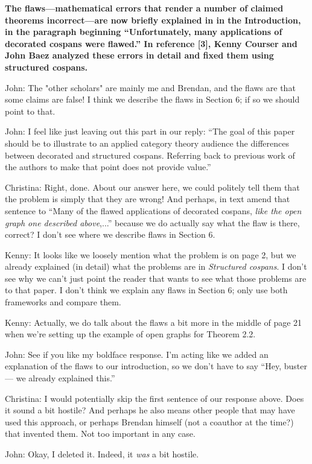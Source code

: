\documentclass[reqno]{amsart}
\def\chris{\color{purple} Christina: }
\def\john{\color{red} John: }
\def\kenny{\color{blue} Kenny: }
\begin{document}
\begin{enumerate}
{\bf  The flaws---mathematical errors that render a number of claimed theorems incorrect---are now briefly explained in  in the Introduction, in the 
paragraph beginning ``Unfortunately, many applications of decorated cospans were flawed.''  In reference [3], Kenny Courser and John Baez analyzed 
these errors in detail and fixed them using structured cospans.  }
  

\iffalse
{\john The "other scholars" are mainly me and Brendan, and the flaws are that some claims are false! I think we describe the flaws in Section 6; if so 
we should point to that.}   

{\john I feel like just leaving out this part in our reply: ``The goal of this paper should be to illustrate to an applied category theory audience the differences between 
decorated and structured cospans. Referring back to previous work of the authors to make that point does not provide value.''}

{\chris Right, done. About our answer here, we could politely tell them that the problem is simply that they are wrong! And perhaps, in 
text amend that sentence to ``Many of the flawed applications of decorated cospans, \emph{like the open graph one described above},...'' because we 
do actually say what the flaw is there, correct? I don't see where we describe flaws in Section 6.}

{\kenny It looks like we loosely mention what the problem is on page 2, but we already explained (in detail) what the problems are in \emph{Structured cospans}. I don't see why we can't just point the reader that wants to see what those problems are to that paper. I don't think we explain any flaws in Section 6; only use both frameworks and compare them.}

{\kenny Actually, we do talk about the flaws a bit more in the middle of page 21 when we're setting up the example of open graphs for Theorem 2.2.}

{\john See if you like my boldface response.  I'm acting like we added an explanation of the flaws to our introduction, so we don't have to say ``Hey, 
buster --- we already explained this.''}

{\chris I would potentially skip the first sentence of our response above. Does it sound a bit hostile? And perhaps he also means other people that 
may have used this approach, or perhaps Brendan himself (not a coauthor at the time?) that invented them. Not too important in any case.}

{\john Okay, I deleted it.  Indeed, it \emph{was} a bit hostile.}


\end{enumerate}
\end{document}
